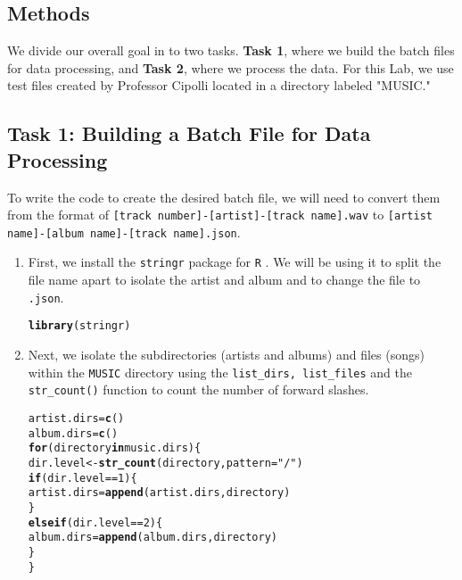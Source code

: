 \documentclass{article}\usepackage[]{graphicx}\usepackage[]{xcolor}
\makeatletter
\newcommand{\hlnum}[1]{\textcolor[rgb]{0.686,0.059,0.569}{#1}}%
\newcommand{\hlsng}[1]{\textcolor[rgb]{0.192,0.494,0.8}{#1}}%
\newcommand{\hlopt}[1]{\textcolor[rgb]{0,0,0}{#1}}%
\newcommand{\hldef}[1]{\textcolor[rgb]{0.345,0.345,0.345}{#1}}%
\newcommand{\hlkwa}[1]{\textcolor[rgb]{0.161,0.373,0.58}{\textbf{#1}}}%
\newcommand{\hlkwb}[1]{\textcolor[rgb]{0.69,0.353,0.396}{#1}}%
\newcommand{\hlkwc}[1]{\textcolor[rgb]{0.333,0.667,0.333}{#1}}%
\newcommand{\hlkwd}[1]{\textcolor[rgb]{0.737,0.353,0.396}{\textbf{#1}}}%
\newenvironment{kframe}{%
 \def\at@end@of@kframe{}%
 \ifinner\ifhmode%
  \def\at@end@of@kframe{\end{minipage}}%
  \begin{minipage}{\columnwidth}%
 \fi\fi%
 \def\FrameCommand##1{\hskip\@totalleftmargin \hskip-\fboxsep
 \colorbox{shadecolor}{##1}\hskip-\fboxsep
     \hskip-\linewidth \hskip-\@totalleftmargin \hskip\columnwidth}%
 \MakeFramed {\advance\hsize-\width
   \@totalleftmargin\z@ \linewidth\hsize
   \@setminipage}}%
 {\par\unskip\endMakeFramed%
 \at@end@of@kframe}
\newenvironment{knitrout}{}{} %
\makeatother
\begin{document}
\begin{multicols}{2}
\section{Methods}
We divide our overall goal in to two tasks. \textbf{Task 1}, where we build the batch files for data processing, and \textbf{Task 2}, where we process the data. For this Lab, we use test files created by Professor Cipolli located in a directory labeled "MUSIC." 


\subsection{Task 1: Building a Batch File for Data Processing}
To write the code to create the desired batch file, we will need to convert them from the format of \texttt{[track number]-[artist]-[track name].wav} to \texttt{[artist name]-[album name]-[track name].json}. 

\begin{enumerate}[1.]\itemsep0em
\item First, we install the \texttt{stringr} package for \texttt{R} \citep{stringr}. We will be using it to split the file name apart to isolate the artist and album and to change the file to \texttt{.json}. 
\begin{knitrout}\scriptsize
{}\color{fgcolor}\begin{kframe}
\begin{alltt}
\hlkwd{library}\hldef{(stringr)}
\end{alltt}
\end{kframe}
\end{knitrout}

\item Next, we isolate the subdirectories (artists and albums) and files (songs) within the \texttt{MUSIC} directory using the \texttt{list\_dirs, list\_files} and the \texttt{str\_count()} function to count the number of forward slashes.
\begin{knitrout}\scriptsize
{}\color{fgcolor}\begin{kframe}
\begin{alltt}
\hldef{artist.dirs} \hlkwb{=} \hlkwd{c}\hldef{()}
\hldef{album.dirs} \hlkwb{=} \hlkwd{c}\hldef{()}
\hlkwa{for} \hldef{(directory} \hlkwa{in} \hldef{music.dirs)\{}
  \hldef{dir.level} \hlkwb{<-} \hlkwd{str_count}\hldef{(directory,} \hlkwc{pattern} \hldef{=} \hlsng{"/"}\hldef{)}
  \hlkwa{if} \hldef{(dir.level} \hlopt{==} \hlnum{1}\hldef{)\{}
  \hldef{artist.dirs} \hlkwb{=} \hlkwd{append}\hldef{(artist.dirs, directory)}
  \hldef{\}}
  \hlkwa{else if} \hldef{(dir.level} \hlopt{==} \hlnum{2}\hldef{)\{}
    \hldef{album.dirs} \hlkwb{=} \hlkwd{append}\hldef{(album.dirs, directory)}
  \hldef{\}}
\hldef{\}}
\end{alltt}
\end{kframe}
\end{knitrout}


\end{enumerate}
\end{multicols}
\end{document}
